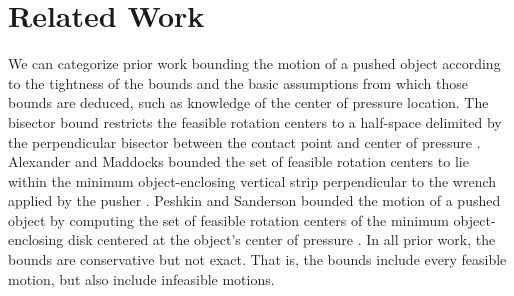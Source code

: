 \documentclass[conference]{IEEEtran}
\begin{document}



\section{Related Work}\label{sec:related-work}



We can categorize prior work bounding the motion of a pushed object
according to the tightness of the bounds and the basic assumptions
from which those bounds are deduced, such as knowledge of the center
of pressure location.
%
The bisector bound restricts the feasible rotation centers to a
half-space delimited by the perpendicular bisector between the contact
point and center of pressure \cite{Mason}.  Alexander and Maddocks
bounded the set of feasible rotation centers to lie within the minimum
object-enclosing vertical strip perpendicular to the wrench applied by
the pusher \cite{alexander1993bounds}.  Peshkin and Sanderson bounded
the motion of a pushed object by computing the set of feasible
rotation centers of the minimum object-enclosing disk centered at the
object's center of pressure \cite{peshkin1988motion}. In all prior
work, the bounds are conservative but not exact. That is, the bounds
include every feasible motion, but also include infeasible motions.
\end{document}
